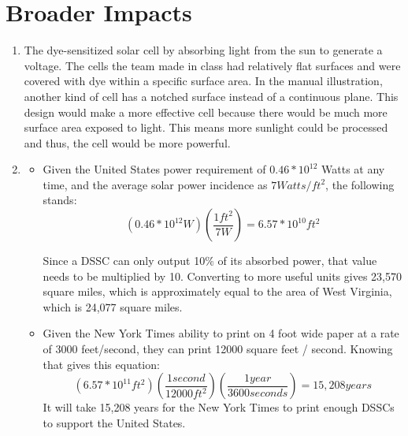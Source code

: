 \documentclass{article}
\begin{document}
\section{Broader Impacts}
\begin{enumerate}
\item The dye-sensitized solar cell by absorbing light from the sun to generate a voltage. The cells the team made in class had relatively flat surfaces and were covered with dye within a specific surface area. In the manual illustration, another kind of cell has a notched surface instead of a continuous plane. This design would make a more effective cell because there would be much more surface area exposed to light. This means more sunlight could be processed and thus, the cell would be more powerful.

\item 
\begin{itemize}
\item Given the United States power requirement of $0.46*10^{12}$ Watts at any time, and the average solar power incidence as $7 Watts/ft^2$, the following stands:
		$$(0.46 * 10^{12} W)(\frac{1 ft^2}{7 W}) = 6.57*10^{10} ft^2$$

Since a DSSC can only output 10\% of its absorbed power, that value needs to be multiplied by 10. Converting to more useful units gives 23,570 square miles, which is approximately equal to the area of West Virginia, which is 24,077 square miles.

\item Given the New York Times ability to print on 4 foot wide paper at a rate of 3000 feet/second, they can print 12000 square feet / second. Knowing that gives this equation: 
$$(6.57*10^{11} ft^2)(\frac{1 second}{12000 ft^2})(\frac{1 year}{3600 seconds}) = 15,208 years$$ 
It will take 15,208 years for the New York Times to print enough DSSCs to support the United States.
\end{itemize}
\end{enumerate}
\end{document}

